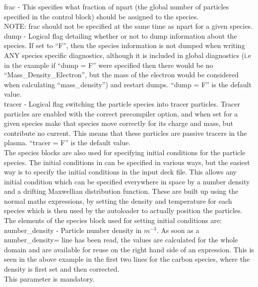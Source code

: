 {\emphtext frac} - This specifies what fraction of npart (the
global number of particles specified in the control block) should be assigned
to the species.\\

{\emphtext NOTE: frac should not be specified at the same time as npart for a
given species.}\\

{\emphtext dump} - Logical flag detailing whether or not to dump
information about the species. If set to ``F'', then the species information
is not dumped when writing ANY species specific diagnostics, although it is
included in global diagnostics (i.e in the example if ``dump = F'' were
specified then there would be no ``Mass\_Density\_Electron'', but the mass of
the electron would be considered when calculating ``mass\_density'') and
restart dumps. ``dump = F'' is the default value.\\

{\emphtext tracer} - Logical flag switching the particle species
into tracer particles. Tracer particles are enabled with the correct
precompiler option, and when set for a given species make that species move
correctly for its charge and mass, but contribute no current. This means that
these particles are passive tracers in the plasma. ``tracer = F'' is the
default value.\\

The species blocks are also used for specifying initial conditions for
the particle species. The initial conditions in {\EPOCH} can be specified in
various ways, but the easiest way is to specify the initial conditions in the
input deck file. This allows any initial condition which can be specified
everywhere in space by a number density and a drifting Maxwellian distribution
function.
These are built up using the normal maths
expressions, by setting the density and temperature for each species which is
then used by the autoloader to actually position the particles. \\
The elements of the species block used for setting
initial conditions are:\\

{\emphtext number\_density} - Particle number density in $m^{-3}$.
As soon as a number\_density= line has been read, the values are
calculated for the whole domain and are available for reuse on the right hand
side of an expression. This is seen in the above example in the first two lines
for the carbon species, where the density is first set and then corrected.\\
This parameter is mandatory.\\

